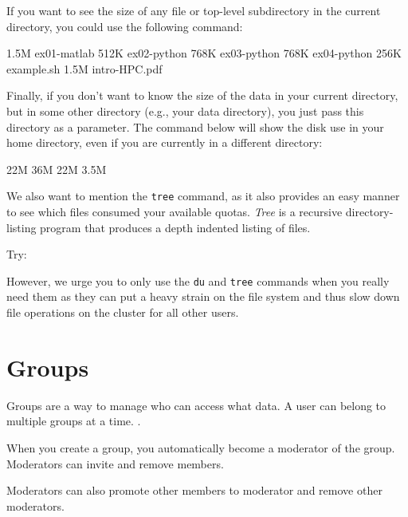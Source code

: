 If you want to see the size of any file or top-level subdirectory in the
current directory, you could use the following command:

\begin{prompt}
1.5M ex01-matlab
512K ex02-python
768K ex03-python
768K ex04-python
256K example.sh
1.5M intro-HPC.pdf
\end{prompt}


Finally, if you don't want to know the size of the data in your current
directory, but in some other directory (e.g., your data directory), you just
pass this directory as a parameter. The command below will show the disk use
in your home directory, even if you are currently in a different directory:

\begin{prompt}
22M %
36M %
22M %
3.5M %
\end{prompt}

\ifgent
\else
  We also want to mention the \texttt{tree} command, as it also provides an easy
  manner to see which files consumed your available quotas. \emph{Tree} is a
  recursive directory-listing program that produces a depth indented listing of
  files.

  Try:

\begin{prompt}
\end{prompt}

However, we urge you to only use the \texttt{du} and \texttt{tree} commands when you
really need them as they can put a heavy strain on the file system and thus
slow down file operations on the cluster for all other users.
\fi

\section{Groups}
\label{sec:vcs-groups}

Groups are a way to manage who can access what data. A user can belong to multiple
groups at a time. .

When you create a group, you automatically become a moderator of the group.
Moderators can invite and remove members.

Moderators can also promote other members to moderator and remove other moderators.

